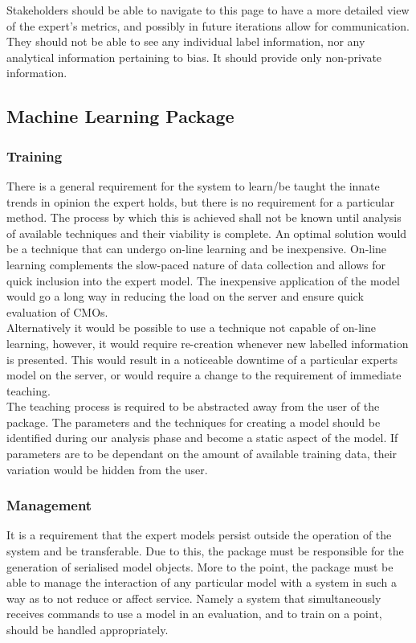 \documentclass{ecmm427_assignment}
\begin{document}
\quad Stakeholders should be able to navigate to this page to have a more detailed view of the expert's metrics, and possibly in future iterations allow for communication. They should not be able to see any individual label information, nor any analytical information pertaining to bias. It should provide only non-private information.

\subsection{Machine Learning Package}
\subsubsection{Training}

\quad There is a general requirement for the system to learn/be taught the innate trends in opinion the expert holds, but there is no requirement for a particular method. The process by which this is achieved shall not be known until analysis of available techniques and their viability is complete. An optimal solution would be a technique that can undergo on-line learning and be inexpensive. On-line learning complements the slow-paced nature of data collection and allows for quick inclusion into the expert model. The inexpensive application of the model would go a long way in reducing the load on the server and ensure quick evaluation of CMOs.\\

\quad Alternatively it would be possible to use a technique not capable of on-line learning, however, it would require re-creation whenever new labelled information is presented. This would result in a noticeable downtime of a particular experts model on the server, or would require a change to the requirement of immediate teaching.\\

\quad The teaching process is required to be abstracted away from the user of the package. The parameters and the techniques for creating a model should be identified during our analysis phase and become a static aspect of the model. If parameters are to be dependant on the amount of available training data, their variation would be hidden from the user.

\subsubsection{Management}

\quad It is a requirement that the expert models persist outside the operation of the system and be transferable. Due to this, the package must be responsible for the generation of serialised model objects. More to the point, the package must be able to manage the interaction of any particular model with a system in such a way as to not reduce or affect service. Namely a system that simultaneously receives commands to use a model in an evaluation, and to train on a point, should be handled appropriately.
\end{document}
